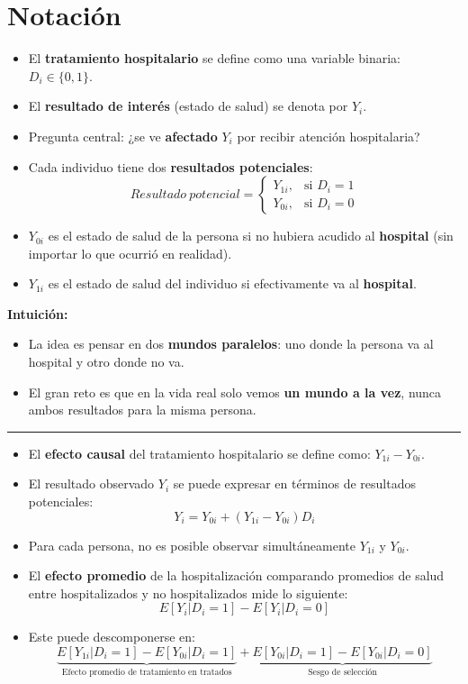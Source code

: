 \documentclass[12pt]{article}
\begin{document}
\section*{\noindent\textbf{Notación}}

\begin{itemize}
    \item El \textbf{tratamiento hospitalario} se define como una variable binaria: $D_i \in \{0,1\}$.
    \item El \textbf{resultado de interés} (estado de salud) se denota por $Y_i$.
    \item Pregunta central: ¿se ve \textbf{afectado} $Y_i$ por recibir atención hospitalaria?
    \item Cada individuo tiene dos \textbf{resultados potenciales}:  
    \[
    Resultado\ potencial =
    \begin{cases}
    Y_{1i}, & \text{si } D_i = 1 \\
    Y_{0i}, & \text{si } D_i = 0
    \end{cases}
    \]
    \item $Y_{0i}$ es el estado de salud de la persona si no hubiera acudido al \textbf{hospital} (sin importar lo que ocurrió en realidad).
    \item $Y_{1i}$ es el estado de salud del individuo si efectivamente va al \textbf{hospital}.
\end{itemize}

\textbf{Intuición:}
\begin{itemize}
    \item La idea es pensar en dos \textbf{mundos paralelos}: uno donde la persona va al hospital y otro donde no va.
    \item El gran reto es que en la vida real solo vemos \textbf{un mundo a la vez}, nunca ambos resultados para la misma persona.
\end{itemize}
\hrule

\begin{itemize}
    \item El \textbf{efecto causal} del tratamiento hospitalario se define como: $Y_{1i} - Y_{0i}$.
    \item El resultado observado $Y_i$ se puede expresar en términos de resultados potenciales:  
    \[
    Y_i = Y_{0i} + (Y_{1i} - Y_{0i}) D_i
    \]
    \item Para cada persona, no es posible observar simultáneamente $Y_{1i}$ y $Y_{0i}$.
    \item El \textbf{efecto promedio} de la hospitalización comparando promedios de salud entre hospitalizados y no hospitalizados mide lo siguiente:
    \[
    E[Y_i|D_i=1] - E[Y_i|D_i=0]
    \]
    \item Este puede descomponerse en:
    \[
    \underbrace{E[Y_{1i}|D_i=1] - E[Y_{0i}|D_i=1]}_{\text{Efecto promedio de tratamiento en tratados}} 
    + 
    \underbrace{E[Y_{0i}|D_i=1] - E[Y_{0i}|D_i=0]}_{\text{Sesgo de selección}}
    \]
\end{itemize}
\end{document}
